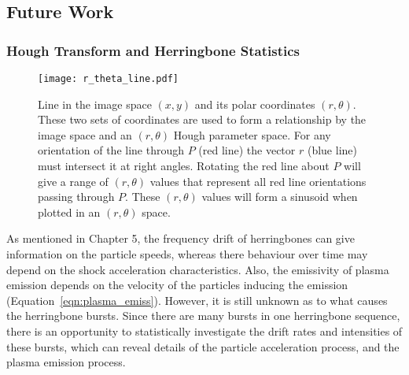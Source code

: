 \subsection{Future Work}

\subsubsection{Hough Transform and Herringbone Statistics}
\begin{figure}[t!]
\begin{center}
\texttt{[image: r\_theta\_line.pdf]}
\caption[Line in polar coordinates]{Line in the image space $(x,y)$ and its polar coordinates $(r, \theta)$. These two sets of coordinates are used to form a relationship by the image space and an $(r, \theta)$ Hough parameter space. For any orientation of the line through $P$ (red line) the vector $r$ (blue line) must intersect it at right angles. Rotating the red line about $P$ will give a range of $(r, \theta)$ values that represent all red line orientations passing through $P$. These $(r, \theta)$ values will form a sinusoid when plotted in an $(r, \theta)$ space.}
\label{fig:r_theta_line}
\end{center}
\end{figure}
As mentioned in Chapter 5, the frequency drift of herringbones can give information on the particle speeds, whereas there behaviour over time may depend on the shock acceleration characteristics. Also, the emissivity of plasma emission depends on the velocity of the particles inducing the emission (Equation~\ref{eqn:plasma_emiss}). However, it is still unknown as to what causes the herringbone bursts. Since there are many bursts in one herringbone sequence, there is an opportunity to statistically investigate the drift rates and intensities of these bursts, which can reveal details of the particle acceleration process, and the plasma emission process.


